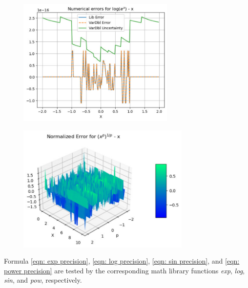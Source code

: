 \documentclass[twoside]{article}
\numberwithin{equation}{section}
\begin{document}
\begin{figure}[p]
\centering
\includegraphics[height=2.5in]{ExpLog_Error.pdf} 
\label{fig: ExpLog_Error}
\end{figure}

\begin{figure}[p]
\centering
\includegraphics[height=2.5in]{Power_Error.pdf} 
\label{fig: Power_Error}
\end{figure}


Formula \eqref{eqn: exp precision}, \eqref{eqn: log precision}, \eqref{eqn: sin precision}, and \eqref{eqn: power precision} are tested by the corresponding math library functions \textit{exp}, \textit{log}, \textit{sin}, and \textit{pow}, respectively.
\end{document}
